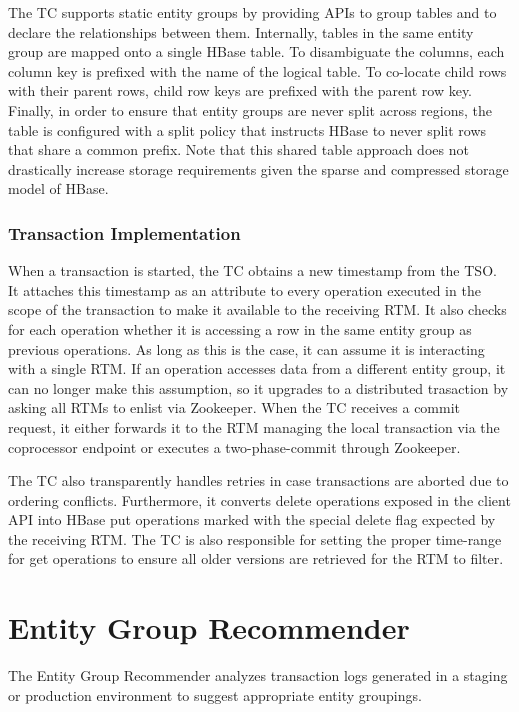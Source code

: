 \documentclass[10pt,final,journal]{IEEEtran}
\begin{document}
The TC supports static entity groups by providing APIs to group tables and to declare the relationships between them. Internally, tables in the same entity group are mapped onto a single HBase table. To disambiguate the columns, each column key is prefixed with the name of the logical table. To co-locate child rows with their parent rows, child row keys are prefixed with the parent row key. Finally, in order to ensure that entity groups are never split across regions, the table is configured with a split policy that instructs HBase to never split rows that share a common prefix. Note that this shared table approach does not drastically increase storage requirements given the sparse and compressed storage model of HBase.

\subsubsection{Transaction Implementation}
When a transaction is started, the TC obtains a new timestamp from the TSO. It attaches this timestamp as an attribute to every operation executed in the scope of the transaction to make it available to the receiving RTM. It also checks for each operation whether it is accessing a row in the same entity group as previous operations. As long as this is the case, it can assume it is interacting with a single RTM. If an operation accesses data from a different entity group, it can no longer make this assumption, so it upgrades to a distributed trasaction by asking all RTMs to enlist via Zookeeper. When the TC receives a commit request, it either forwards it to the RTM managing the local transaction via the coprocessor endpoint or executes a two-phase-commit through Zookeeper.

The TC also transparently handles retries in case transactions are aborted due to ordering conflicts. Furthermore, it converts delete operations exposed in the client API into HBase put operations marked with the special delete flag expected by the receiving RTM. The TC is also responsible for setting the proper time-range for get operations to ensure all older versions are retrieved for the RTM to filter.

\section{Entity Group Recommender}
The Entity Group Recommender analyzes transaction logs generated in a staging or production environment to suggest appropriate entity groupings.
\end{document}
